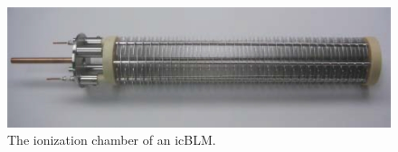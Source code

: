\begin{figure}[!ht]
	\begin{center}
		\includegraphics[width=\textwidth]{02_BeamDiag/figures/fig000_icBLM}
	\end{center}
	\caption[The ionization chamber of an icBLM]{The ionization chamber of an icBLM.}
	\label{chap2:fig:icBLM}
\end{figure}
